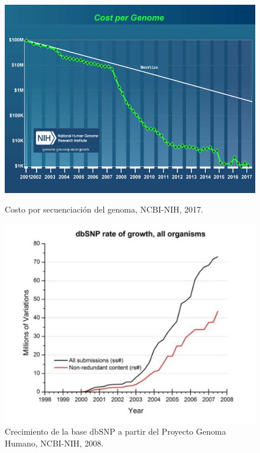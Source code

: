\begin{figure}[H]
\begin{minipage}[c]{0.45\linewidth}
\includegraphics[width=\linewidth]{documents/latex/figures/1/costpergenome_2017.pdf}
\caption{Costo por secuenciación del genoma, NCBI-NIH, 2017.}
\label{fig:cost_per_genome}
\end{minipage}
\hfill
\begin{minipage}[c]{0.45\linewidth}
\includegraphics[width=\linewidth]{documents/latex/figures/1/increase_dbsnp.pdf}
\caption{Crecimiento de la base dbSNP a partir del Proyecto Genoma Humano, NCBI-NIH, 2008. }
\label{fig:dbsnp_growth_rate}
\end{minipage}%
\end{figure}

